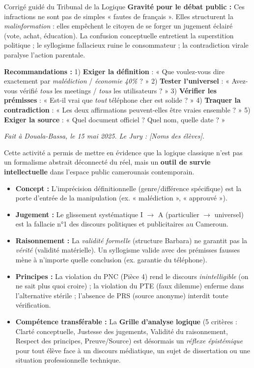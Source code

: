 \documentclass[11pt]{article}
\newcommand{\cle}[1]{{\popxbold\color{popdark}#1}}
\newcounter{popsec}
\newcounter{popsub}
\newcommand{\courssub}[1]{%
  \stepcounter{popsub}%
  \par\vspace{9pt}\noindent{\popxbold\fontsize{11.5}{13}\selectfont\color{popink}{\color{poporange}\thepopsec.\thepopsub}\hspace{6pt}#1}\par\nopagebreak\vspace{4pt}
}
\begin{document}
\begin{exoresolu}{Corrigé guidé du Tribunal de la Logique}
\textbf{Gravité pour le débat public :}
Ces infractions ne sont pas de simples « fautes de français ». Elles structurent la \emph{malinformation} : elles empêchent le citoyen de se forger un jugement éclairé (vote, achat, éducation). La confusion conceptuelle entretient la superstition politique ; le syllogisme fallacieux ruine le consommateur ; la contradiction virale paralyse l'action parentale.

\textbf{Recommandations :}
1) \textbf{Exiger la définition} : « Que voulez-vous dire exactement par \textit{malédiction} / \textit{économie 40\%} ? »
2) \textbf{Tester l'universel} : « Avez-vous vérifié \textit{tous} les meetings / \textit{tous} les utilisateurs ? »
3) \textbf{Vérifier les prémisses} : « Est-il vrai que \textit{tout} téléphone cher est solide ? »
4) \textbf{Traquer la contradiction} : « Les deux affirmations peuvent-elles être vraies ensemble ? »
5) \textbf{Exiger la source} : « Quel document officiel ? Quel nom, quelle date ? »

\textit{Fait à Douala-Bassa, le 15 mai 2025. Le Jury : [Noms des élèves].}
\end{exoresolu}

\courssub{Bilan de l'activité}
Cette activité a permis de mettre en évidence que la \cle{logique classique} n'est pas un formalisme abstrait déconnecté du réel, mais un \textbf{outil de survie intellectuelle} dans l'espace public camerounais contemporain.

\begin{aretenir}
\begin{itemize}
    \item \textbf{Concept :} L'imprécision définitionnelle (genre/différence spécifique) est la porte d'entrée de la manipulation (ex. « malédiction », « approuvé »).
    \item \textbf{Jugement :} Le glissement systématique I $\rightarrow$ A (particulier $\rightarrow$ universel) est la fallacie n°1 des discours politiques et publicitaires au Cameroun.
    \item \textbf{Raisonnement :} La \emph{validité formelle} (structure Barbara) ne garantit pas la \emph{vérité} (validité matérielle). Un syllogisme valide avec des prémisses fausses mène à n'importe quelle conclusion (ex. garantie du téléphone).
    \item \textbf{Principes :} La violation du PNC (Pièce 4) rend le discours \emph{inintelligible} (on ne sait plus quoi croire) ; la violation du PTE (faux dilemme) enferme dans l'alternative stérile ; l'absence de PRS (source anonyme) interdit toute vérification.
    \item \textbf{Compétence transférable :} La \textbf{Grille d'analyse logique} (5 critères : Clarté conceptuelle, Justesse des jugements, Validité du raisonnement, Respect des principes, Preuve/Source) est désormais un \emph{réflexe épistémique} pour tout élève face à un discours médiatique, un sujet de dissertation ou une situation professionnelle technique.
\end{itemize}
\end{aretenir}
\end{document}
